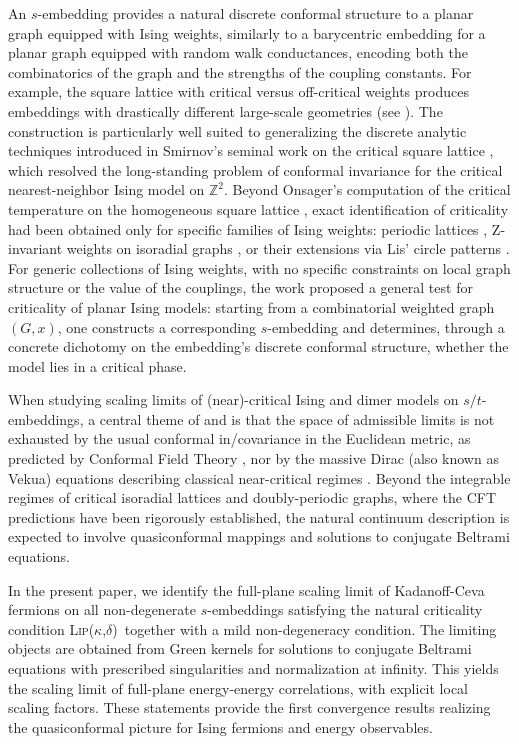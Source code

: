 \documentclass[reqno]{amsart}
\numberwithin{equation}{section}
\theoremstyle{definition}
\theoremstyle{remark}
\def\LipKd{{\mbox{\textsc{Lip(}$\kappa$\textsc{,}$\delta$\textsc{)}}}}
\begin{document}
An $s$-embedding provides a natural discrete conformal structure to a planar graph equipped with Ising weights, similarly to a barycentric embedding for a planar graph equipped with random walk conductances, encoding both the combinatorics of the graph and the strengths of the coupling constants. For example, the square lattice with critical versus off-critical weights produces embeddings with drastically different large-scale geometries (see \cite[Figure 2]{Che20}). The construction is particularly well suited to generalizing the discrete analytic techniques introduced in Smirnov’s seminal work on the critical square lattice \cite{Smi-ICM06,Smirnov_Ising}, which resolved the long-standing problem of conformal invariance for the critical nearest-neighbor Ising model on $\mathbb{Z}^2$. Beyond Onsager's computation of the critical temperature on the homogeneous square lattice \cite{Ons44}, exact identification of criticality had been obtained only for specific families of Ising weights: periodic lattices \cite{cimasoni-duminil,Che20,DCHN}, Z-invariant weights on isoradial graphs \cite{BdTR2,park-iso,ChSmi2}, or their extensions via Lis' circle patterns \cite{lis-kites}. For generic collections of Ising weights, with no specific constraints on local graph structure or the value of the couplings, the work \cite{Mah23} proposed a general test for criticality of planar Ising models: starting from a combinatorial weighted graph $(G,x)$, one constructs a corresponding $s$-embedding and determines, through a concrete dichotomy on the embedding's discrete conformal structure, whether the model lies in a critical phase.

When studying scaling limits of (near)-critical Ising and dimer models on
$s/t$-embeddings, a central theme of \cite{CLR1,CLR2} and
\cite[Section~2.7]{Che20} is that the space of admissible limits is not exhausted by the usual conformal in/covariance in the Euclidean metric, as predicted by Conformal Field Theory \cite{Zam,Zam2}, nor by the massive Dirac (also known as Vekua) equations describing classical near-critical regimes
\cite{mccoy1977painleve,sato1979holonomic}. Beyond the integrable regimes of critical isoradial lattices and doubly-periodic graphs, where the CFT predictions have been rigorously established, the natural continuum description is expected to involve quasiconformal mappings and solutions to conjugate Beltrami equations.

In the present paper, we identify the full-plane scaling limit of Kadanoff-Ceva fermions on all non-degenerate $s$-embeddings satisfying the natural criticality condition \LipKd\ together with a mild non-degeneracy condition. The limiting objects are obtained from Green kernels for solutions to conjugate Beltrami equations with prescribed singularities and normalization at infinity. This yields the scaling limit of full-plane energy-energy correlations, with explicit local scaling factors. These  statements provide the first convergence results realizing the quasiconformal picture for Ising fermions and energy observables.
\end{document}
